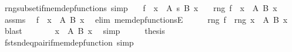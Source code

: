 \begin{isabellebody}
\isanewline
{}\isamarkupfalse%
\ rng{\isacharunderscore}{\kern0pt}subset{\isacharunderscore}{\kern0pt}if{\isacharunderscore}{\kern0pt}mem{\isacharunderscore}{\kern0pt}dep{\isacharunderscore}{\kern0pt}functions\ {\isacharbrackleft}{\kern0pt}simp{\isacharbrackright}{\kern0pt}{\isacharcolon}{\kern0pt}\isanewline
\ \ \ {\isachardoublequoteopen}f\ {\isasymin}\ {\isacharparenleft}{\kern0pt}x\ {\isasymin}\ A{\isacharparenright}{\kern0pt}\ {\isasymrightarrow}s\ {\isacharparenleft}{\kern0pt}B\ x{\isacharparenright}{\kern0pt}{\isachardoublequoteclose}\isanewline
\ \ \ {\isachardoublequoteopen}rng\ f\ {\isasymsubseteq}\ {\isacharparenleft}{\kern0pt}{\isasymUnion}x\ {\isasymin}\ A{\isachardot}{\kern0pt}\ B\ x{\isacharparenright}{\kern0pt}{\isachardoublequoteclose}\isanewline
%
\isadelimproof
%
\endisadelimproof
%
\isatagproof
{}\isamarkupfalse%
\ {\isacharminus}{\kern0pt}\isanewline
\ \ \isamarkupfalse%
\ assms\ \isamarkupfalse%
\ {\isachardoublequoteopen}f\ {\isasymsubseteq}\ {\isasymSum}x\ {\isasymin}\ A{\isachardot}{\kern0pt}\ {\isacharparenleft}{\kern0pt}B\ x{\isacharparenright}{\kern0pt}{\isachardoublequoteclose}\ \isamarkupfalse%
\ {\isacharparenleft}{\kern0pt}elim\ mem{\isacharunderscore}{\kern0pt}dep{\isacharunderscore}{\kern0pt}functionsE{\isacharparenright}{\kern0pt}\isanewline
\ \ \isamarkupfalse%
\ \isamarkupfalse%
\ {\isachardoublequoteopen}rng\ f\ {\isasymsubseteq}\ rng\ {\isacharparenleft}{\kern0pt}{\isasymSum}x\ {\isasymin}\ A{\isachardot}{\kern0pt}\ {\isacharparenleft}{\kern0pt}B\ x{\isacharparenright}{\kern0pt}{\isacharparenright}{\kern0pt}{\isachardoublequoteclose}\ \isamarkupfalse%
\ blast\isanewline
\ \ \isamarkupfalse%
\ \isamarkupfalse%
\ {\isachardoublequoteopen}{\isachardot}{\kern0pt}{\isachardot}{\kern0pt}{\isachardot}{\kern0pt}\ {\isasymsubseteq}\ {\isacharparenleft}{\kern0pt}{\isasymUnion}x\ {\isasymin}\ A{\isachardot}{\kern0pt}\ B\ x{\isacharparenright}{\kern0pt}{\isachardoublequoteclose}\ \isamarkupfalse%
\ simp\isanewline
\ \ \isamarkupfalse%
\ \isamarkupfalse%
\ {\isacharquery}{\kern0pt}thesis\ \isacommand{{\isachardot}{\kern0pt}}\isamarkupfalse%
\isanewline
{}\isamarkupfalse%
%
\endisatagproof
{\isafoldproof}%
%
\isadelimproof
\isanewline
%
\endisadelimproof
\isanewline
{}\isamarkupfalse%
\ fst{\isacharunderscore}{\kern0pt}snd{\isacharunderscore}{\kern0pt}eq{\isacharunderscore}{\kern0pt}pair{\isacharunderscore}{\kern0pt}if{\isacharunderscore}{\kern0pt}mem{\isacharunderscore}{\kern0pt}dep{\isacharunderscore}{\kern0pt}function\ {\isacharbrackleft}{\kern0pt}simp{\isacharbrackright}{\kern0pt}{\isacharcolon}{\kern0pt}\isanewline

\end{isabellebody}
